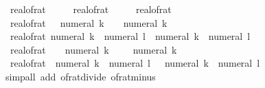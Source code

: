 \begin{isabellebody}
\ \ {\isachardoublequoteopen}real{\isacharunderscore}{\kern0pt}of{\isacharunderscore}{\kern0pt}rat\ {}\ {\isacharequal}{\kern0pt}\ {}{\isachardoublequoteclose}\isanewline
\ \ {\isachardoublequoteopen}real{\isacharunderscore}{\kern0pt}of{\isacharunderscore}{\kern0pt}rat\ {}\ {\isacharequal}{\kern0pt}\ {}{\isachardoublequoteclose}\isanewline
\ \ {\isachardoublequoteopen}real{\isacharunderscore}{\kern0pt}of{\isacharunderscore}{\kern0pt}rat\ {\isacharparenleft}{\kern0pt}{\isacharminus}{\kern0pt}\ {}{\isacharparenright}{\kern0pt}\ {\isacharequal}{\kern0pt}\ {\isacharminus}{\kern0pt}\ {}{\isachardoublequoteclose}\isanewline
\ \ {\isachardoublequoteopen}real{\isacharunderscore}{\kern0pt}of{\isacharunderscore}{\kern0pt}rat\ {\isacharparenleft}{\kern0pt}{}\ {\isacharslash}{\kern0pt}\ numeral\ k{\isacharparenright}{\kern0pt}\ {\isacharequal}{\kern0pt}\ {}\ {\isacharslash}{\kern0pt}\ numeral\ k{\isachardoublequoteclose}\isanewline
\ \ {\isachardoublequoteopen}real{\isacharunderscore}{\kern0pt}of{\isacharunderscore}{\kern0pt}rat\ {\isacharparenleft}{\kern0pt}numeral\ k\ {\isacharslash}{\kern0pt}\ numeral\ l{\isacharparenright}{\kern0pt}\ {\isacharequal}{\kern0pt}\ numeral\ k\ {\isacharslash}{\kern0pt}\ numeral\ l{\isachardoublequoteclose}\isanewline
\ \ {\isachardoublequoteopen}real{\isacharunderscore}{\kern0pt}of{\isacharunderscore}{\kern0pt}rat\ {\isacharparenleft}{\kern0pt}{\isacharminus}{\kern0pt}\ {\isacharparenleft}{\kern0pt}{}\ {\isacharslash}{\kern0pt}\ numeral\ k{\isacharparenright}{\kern0pt}{\isacharparenright}{\kern0pt}\ {\isacharequal}{\kern0pt}\ {\isacharminus}{\kern0pt}\ {\isacharparenleft}{\kern0pt}{}\ {\isacharslash}{\kern0pt}\ numeral\ k{\isacharparenright}{\kern0pt}{\isachardoublequoteclose}\isanewline
\ \ {\isachardoublequoteopen}real{\isacharunderscore}{\kern0pt}of{\isacharunderscore}{\kern0pt}rat\ {\isacharparenleft}{\kern0pt}{\isacharminus}{\kern0pt}\ {\isacharparenleft}{\kern0pt}numeral\ k\ {\isacharslash}{\kern0pt}\ numeral\ l{\isacharparenright}{\kern0pt}{\isacharparenright}{\kern0pt}\ {\isacharequal}{\kern0pt}\ {\isacharminus}{\kern0pt}\ {\isacharparenleft}{\kern0pt}numeral\ k\ {\isacharslash}{\kern0pt}\ numeral\ l{\isacharparenright}{\kern0pt}{\isachardoublequoteclose}\isanewline
%
\isadelimproof
\ \ %
\endisadelimproof
%
\isatagproof
{}\isamarkupfalse%
\ {\isacharparenleft}{\kern0pt}simp{\isacharunderscore}{\kern0pt}all\ add{\isacharcolon}{\kern0pt}\ of{\isacharunderscore}{\kern0pt}rat{\isacharunderscore}{\kern0pt}divide\ of{\isacharunderscore}{\kern0pt}rat{\isacharunderscore}{\kern0pt}minus{\isacharparenright}{\kern0pt}%

\end{isabellebody}
